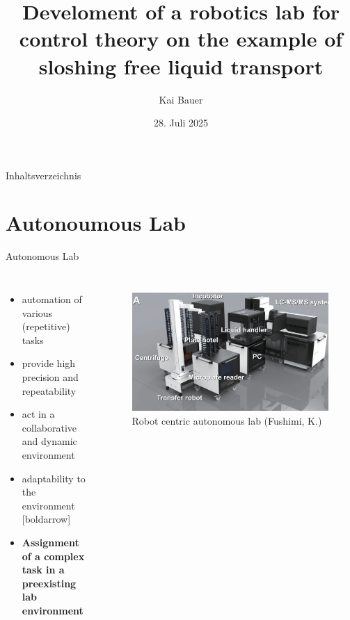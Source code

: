 \documentclass[de]{sdqbeamer}
\title[Develoment of a robotics lab for control theory on the example of sloshing free liquid transport]{Develoment of a robotics lab for control theory on the example of sloshing free liquid transport}
\subtitle{}
\author[Bauer]{Kai Bauer}
\date[28.\,07.\,2025]{28. Juli 2025}
\begin{document}
 

\KITtitleframe


\begin{frame}{Inhaltsverzeichnis}
\tableofcontents
\end{frame}


\section{Autonoumous Lab}
\begin{frame}{Autonomous Lab}
    \begin{columns}[t]
            \begin{itemize}
                [tikzarrow]
                \item automation of various (repetitive) tasks
                \item provide high precision and repeatability
                \item act in a collaborative and dynamic environment
                \item adaptability to the environment
                \linebreak
                [boldarrow]
                \item \bf{Assignment of a complex task in a preexisting lab environment}
            \end{itemize}        
            \vspace{-15pt}
            \begin{figure}
                \centering
                \includegraphics[scale=0.18]{graphics/stationary_lab.pdf}
                \footnotesize Robot centric autonomous lab (Fushimi, K.)
            \end{figure}
    \end{columns}
\end{frame}
\end{document}
